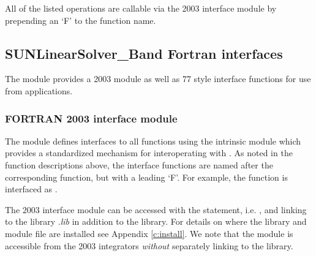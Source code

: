 All of the listed operations are callable via the {\F} 2003 interface module
by prepending an `F' to the function name.


\subsection{SUNLinearSolver\_Band Fortran interfaces}
\label{ss:sunlinsol_band_fortran}

The {\sunlinsolband} module provides a {\F} 2003 module as well as {\F} 77
style interface functions for use from {\F} applications.

\subsubsection*{FORTRAN 2003 interface module}
The  {\F} module defines interfaces to all
{\sunlinsolband} {\CC} functions using the intrinsic 
module which provides a standardized mechanism for interoperating with {\CC}. As
noted in the {\CC} function descriptions above, the interface functions are
named after the corresponding {\CC} function, but with a leading `F'. For
example, the function  is interfaced as
.

The {\F} 2003 {\sunlinsolband} interface module can be accessed with the 
statement, i.e. , and linking to the library
.{\em lib} in addition to the {\CC} library.
For details on where the library and module file
 are installed see Appendix \ref{c:install}.
We note that the module is accessible from the {\F} 2003 {\sundials} integrators
\textit{without} separately linking to the
 library.

